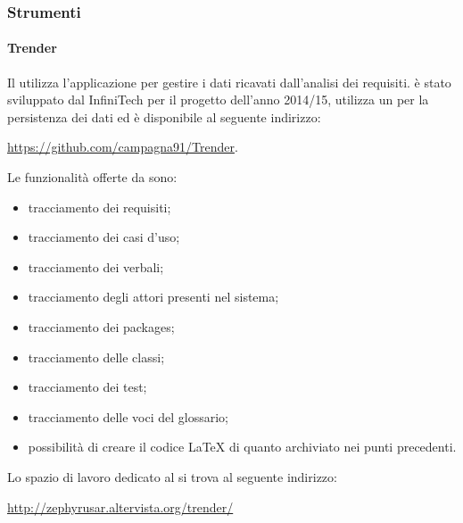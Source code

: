 
        \subsubsection{Strumenti}
            \paragraph{Trender}\label{par:trender}
            Il  utilizza l'applicazione  per gestire i dati ricavati dall'analisi dei requisiti.  è stato sviluppato dal  InfiniTech per il progetto dell'anno 2014/15, utilizza un   per la persistenza dei dati ed è disponibile al seguente indirizzo:
            \begin{center}
	            \url{https://github.com/campagna91/Trender}.
            \end{center}
            Le funzionalità offerte da  sono:
            \begin{itemize}
                \item tracciamento dei requisiti;
                \item tracciamento dei casi d’uso;
                \item tracciamento dei verbali;
                \item tracciamento degli attori presenti nel sistema;
                \item tracciamento dei packages;
                \item tracciamento delle classi;
                \item tracciamento dei test;
                \item tracciamento delle voci del glossario;
                \item possibilità di creare il codice \LaTeX{} di quanto archiviato nei punti precedenti.
            \end{itemize}
	        Lo spazio di lavoro dedicato al  si trova al seguente indirizzo:
			\begin{center}
				\url{http://zephyrusar.altervista.org/trender/}
			\end{center}
